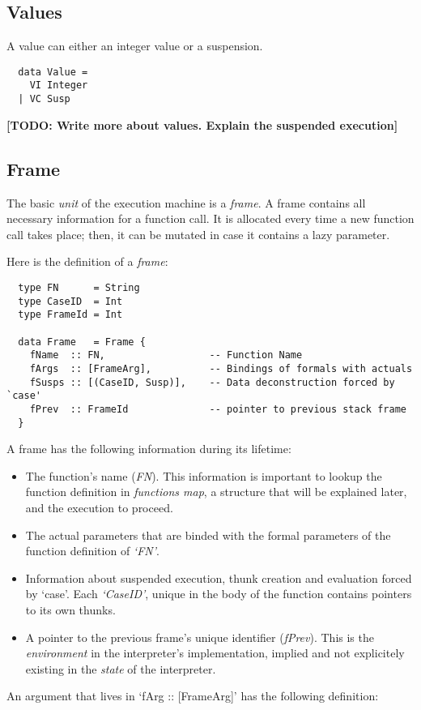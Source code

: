 \documentclass[diploma]{softlab-thesis}
\begin{document}
\subsection{Values}

A value can either an integer value or a suspension.

\begin{verbatim}
  data Value = 
    VI Integer 
  | VC Susp 
\end{verbatim}

\textbf{[TODO: Write more about values. Explain the suspended execution]}

\subsection{Frame}

The basic \textit{unit} of the execution machine is a \textit{frame}. A frame contains all necessary information 
for a function call. It is allocated every time a new function call takes place; then, it can be mutated in case it contains
a lazy parameter.
\newline
\par Here is the definition of a \textit{frame}:
\begin{verbatim}
  type FN      = String 
  type CaseID  = Int 
  type FrameId = Int 

  data Frame   = Frame {
    fName  :: FN,                  -- Function Name
    fArgs  :: [FrameArg],          -- Bindings of formals with actuals
    fSusps :: [(CaseID, Susp)],    -- Data deconstruction forced by `case'
    fPrev  :: FrameId              -- pointer to previous stack frame 
  }
\end{verbatim}

A frame has the following information during its lifetime:
\begin{itemize}
  \item The function's name (\textit{FN}). This information is important to lookup the function 
  definition in \textit{functions map}, a structure that will be explained later, and the execution to 
  proceed.
  \item The actual parameters that are binded with the formal parameters of the function 
  definition of \textit{`FN'}.
  \item Information about suspended execution, thunk creation and evaluation forced by `case'. Each \textit{`CaseID'}, 
  unique in the body of the function contains pointers to its own thunks.
  \item A pointer to the previous frame's unique identifier (\textit{fPrev}). This is the \textit{environment} in the 
  interpreter's implementation, implied and not explicitely existing in the \textit{state} of the interpreter.
\end{itemize} 
An argument that lives in `fArg :: [FrameArg]' has the following definition:
\end{document}
